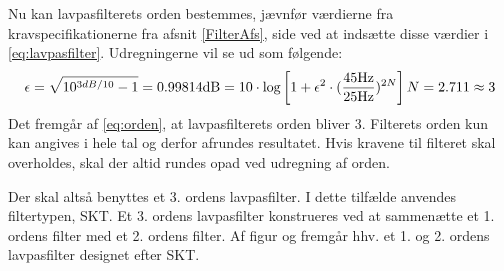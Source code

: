 Nu kan lavpasfilterets orden bestemmes, jævnfør værdierne fra kravspecifikationerne fra afsnit \ref{FilterAfs}, side \pageref{FilterAfs} ved at indsætte disse værdier i \eqref{eq:lavpasfilter}. Udregningerne vil se ud som følgende:
\begin{equation}
\epsilon = \sqrt{10^{3dB /10} -1} = 0.998 \\ \label{eq:orden}
14\text{dB} = 10 \cdot \text{log} \left[1 + \epsilon ^2 \cdot (\frac{45\text{Hz}}{25\text{Hz}})^{2N}\right] \\
N = 2.711 \approx 3
\end{equation}
\noindent Det fremgår af \eqref{eq:orden}, at lavpasfilterets orden bliver $3$. Filterets orden kun kan angives i hele tal og derfor afrundes resultatet. Hvis kravene til filteret skal overholdes, skal der altid rundes opad ved udregning af orden.

Der skal altså benyttes et 3. ordens lavpasfilter. I dette tilfælde anvendes filtertypen, SKT. Et 3. ordens lavpasfilter konstrueres ved at sammenætte et 1. ordens filter med et 2. ordens filter. Af figur  og  fremgår hhv. et 1. og 2. ordens lavpasfilter designet efter SKT. \cite{Carter2013}
	
